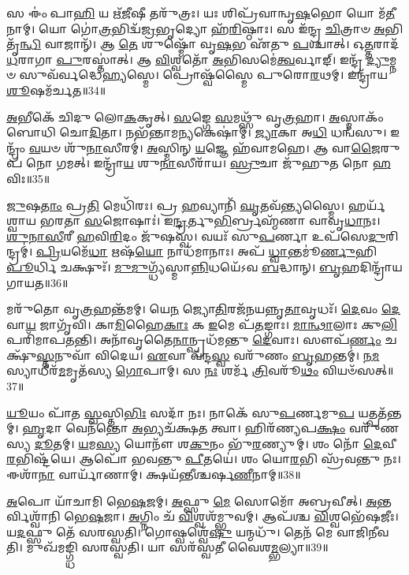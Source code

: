 𑌸 𑌈𑌂॑ 𑌪𑌾\-\ul{𑌹𑌿} 𑌯 𑌋᳴\-\ul{𑌜𑍀}\-𑌷𑍀 𑌤𑌰𑍁᳴𑌤𑍍𑌰𑌃।
𑌯𑌃 𑌶𑌿𑌪𑍍𑌰᳴𑌵𑌾𑌨𑍍𑌵𑍃\-\ul{𑌷}\-𑌭𑍋 𑌯𑍋 𑌮᳴\-\ul{𑌤𑍀}\-𑌨𑌾𑌮𑍍।
𑌯𑍋 𑌗𑍋॑\-\ul{𑌤𑍍𑌰}\-𑌭𑌿𑌦𑍍𑌵᳴\-\ul{𑌜𑍍𑌰}\-𑌭𑍃𑌦𑍍𑌯𑍋 𑌹᳴\-\ul{𑌰𑌿}\-𑌷𑍍𑌠𑌾𑌃।
𑌸 𑌇᳴𑌨𑍍𑌦𑍍𑌰 \ul{𑌚𑌿}\-𑌤𑍍𑌰𑌾𑍞 \ul{𑌅}\-𑌭𑌿 𑌤𑍃᳴\-\ul{𑌨𑍍𑌧𑌿} 𑌵𑌾𑌜𑌾𑌨𑍍᳴।
𑌆 \ul{𑌤𑍇} 𑌶𑍁𑌷𑍍𑌮𑍋᳴ 𑌵𑍃\-\ul{𑌷}\-𑌭 𑌏᳴𑌤𑍁 \ul{𑌪}\-𑌶𑍍𑌚𑌾𑌤𑍍।
𑌓\-\ul{𑌤𑍍𑌤}\-𑌰𑌾𑌦᳴\-\ul{𑌧}\-𑌰𑌾𑌗𑌾 \ul{𑌪𑍁}\-𑌰𑌸𑍍𑌤𑌾॑𑌤𑍍।
𑌆 \ul{𑌵𑌿}\-𑌶𑍍𑌵𑌤𑍋᳴ \ul{𑌅}\-𑌭𑌿𑌸𑌮𑍇॑\-\ul{𑌤𑍍𑌵}\-𑌰𑍍𑌵𑌾𑌙𑍍।
𑌇𑌨𑍍𑌦𑍍𑌰᳴ \ul{𑌦𑍍𑌯𑍁}\-𑌮𑍍𑌨𑍞 𑌸𑍁𑌵᳴𑌰𑍍𑌵𑌦𑍍𑌧𑍇\-\ul{𑌹𑍍𑌯}\-𑌸𑍍𑌮𑍇।
𑌪𑍍𑌰𑍋𑌷𑍍𑌵᳴𑌸𑍍𑌮𑍈 𑌪𑍁𑌰𑍋\-\ul{𑌰}\-𑌥𑌮𑍍।
𑌇𑌨𑍍𑌦𑍍𑌰𑌾᳴𑌯 \ul{𑌶𑍂}\-𑌷𑌮᳴𑌰𑍍𑌚𑌤॥34॥

\-\ul{𑌅}\-𑌭𑍀𑌕𑍇᳴ 𑌚𑌿𑌦𑍁 𑌲𑍋\-\ul{𑌕}\-𑌕𑍃𑌤𑍍।
\-\ul{𑌸}\-𑌙𑍍𑌗𑍇 \ul{𑌸}\-𑌮𑌥𑍍𑌸𑍁᳴ 𑌵𑍃\-\ul{𑌤𑍍𑌰}\-𑌹𑌾।
\-\ul{𑌅}\-𑌸𑍍𑌮𑌾𑌕𑌂᳴ 𑌬𑍋𑌧𑌿 𑌚𑍋\-\ul{𑌦𑌿}\-𑌤𑌾।
𑌨𑌭᳴𑌨𑍍𑌤𑌾𑌮\-\ul{𑌨𑍍𑌯}\-𑌕𑍇𑌷𑌾॑𑌮𑍍।
\-\ul{𑌜𑍍𑌯𑌾}\-𑌕𑌾 𑌅\-\ul{𑌧𑌿} 𑌧𑌨𑍍𑌵᳴𑌸𑍁।
𑌇𑌨𑍍𑌦𑍍𑌰𑌂᳴ \ul{𑌵}\-𑌯𑍞 𑌶𑍁᳴\-\ul{𑌨𑌾}\-𑌸𑍀𑌰𑌮𑍍॑।
\-\ul{𑌅}\-𑌸𑍍𑌮𑌿𑌨𑍍 \ul{𑌯}\-𑌜𑍍𑌞𑍇 𑌹᳴𑌵𑌾𑌮𑌹𑍇।
𑌆 𑌵𑌾\-\ul{𑌜𑍈}\-𑌰𑍁𑌪᳴ 𑌨𑍋 𑌗𑌮𑌤𑍍।
𑌇𑌨𑍍𑌦𑍍𑌰𑌾᳴\-\ul{𑌯} 𑌶𑍁\-\ul{𑌨𑌾}\-𑌸𑍀𑌰𑌾᳴𑌯।
\-\ul{𑌸𑍍𑌰𑍁}\-𑌚𑌾 𑌜𑍁᳴𑌹𑍁𑌤 𑌨𑍋 \ul{𑌹}\-𑌵𑌿𑌃॥35॥

\-\ul{𑌜𑍁}\-𑌷\-\ul{𑌤𑌾𑌂} 𑌪𑍍𑌰\-\ul{𑌤𑌿} 𑌮𑍇𑌧𑌿᳴𑌰𑌃।
𑌪𑍍𑌰 \ul{𑌹}\-𑌵𑍍𑌯𑌾𑌨𑌿᳴ \ul{𑌘𑍃}\-𑌤𑌵᳴𑌨𑍍𑌤𑍍𑌯𑌸𑍍𑌮𑍈।
𑌹𑌰𑍍𑌯᳴𑌶𑍍𑌵𑌾𑌯 𑌭𑌰𑌤𑌾 \ul{𑌸}\-𑌜𑍋𑌷𑌾𑌃॑।
𑌇\-\ul{𑌨𑍍𑌦𑍍𑌰}\-𑌰𑍍𑌤𑍁\-\ul{𑌭𑌿}\-𑌰𑍍𑌬𑍍𑌰𑌹𑍍𑌮᳴𑌣𑌾 𑌵𑌾𑌵𑍃\-\ul{𑌧𑌾}\-𑌨𑌃।
\-\ul{𑌶𑍁}\-\-\ul{𑌨𑌾}\-\-\ul{𑌸𑍀}\-𑌰𑍀 \ul{𑌹}\-𑌵𑌿\-\ul{𑌰𑌿}\-𑌦𑌂 𑌜𑍁᳴𑌷𑌸𑍍𑌵।
𑌵𑌯𑌃᳴ 𑌸𑍁\-\ul{𑌪}\-𑌰𑍍𑌣𑌾 𑌉𑌪᳴𑌸𑍇\-\ul{𑌦𑍁}\-𑌰𑌿𑌨𑍍𑌦𑍍𑌰𑌮𑍍॑।
\-\ul{𑌪𑍍𑌰𑌿}\-𑌯𑌮𑍇᳴\-\ul{𑌧𑌾} 𑌋𑌷᳴\-\ul{𑌯𑍋} 𑌨𑌾𑌧᳴𑌮𑌾𑌨𑌾𑌃।
𑌅𑌪᳴ \ul{𑌧𑍍𑌵𑌾}\-𑌨𑍍𑌤𑌮𑍂॑\-\ul{𑌰𑍍𑌣𑍁}\-𑌹𑌿 \ul{𑌪𑍂}\-𑌰𑍍𑌧𑌿 𑌚𑌕𑍍𑌷𑍁𑌃᳴।
\-\ul{𑌮𑍁}\-\-\ul{𑌮𑍁}\-𑌗𑍍𑌧𑍍𑌯᳴𑌸𑍍𑌮𑌾\-\ul{𑌨𑍍𑌨𑌿}\-𑌧𑌯𑍇᳴𑌽𑌵 \ul{𑌬}\-𑌦𑍍𑌧𑌾𑌨𑍍।
\-\ul{𑌬𑍃}\-𑌹𑌦𑌿𑌨𑍍𑌦𑍍𑌰𑌾᳴𑌯 𑌗𑌾𑌯𑌤॥36॥

𑌮𑌰𑍁᳴𑌤𑍋 𑌵𑍃\-\ul{𑌤𑍍𑌰}\-𑌹𑌨𑍍𑌤᳴𑌮𑌮𑍍।
𑌯𑍇\-\ul{𑌨} 𑌜𑍍𑌯𑍋\-\ul{𑌤𑌿}\-𑌰𑌜᳴𑌨𑌯𑌨𑍍𑌨𑍃\-\ul{𑌤𑌾}\-𑌵𑍃𑌧𑌃᳴।
\-\ul{𑌦𑍇}\-𑌵𑌂 \ul{𑌦𑍇}\-𑌵𑌾\-\ul{𑌯} 𑌜𑌾𑌗𑍃᳴𑌵𑌿।
𑌕𑌾\-\ul{𑌮𑌿}\-𑌹𑍈\-\ul{𑌕𑌾𑌃} 𑌕 \ul{𑌇}\-𑌮𑍇 𑌪᳴\-\ul{𑌤}\-𑌙𑍍𑌗𑌾𑌃।
\-\ul{𑌮𑌾}\-\-\ul{𑌨𑍍𑌥𑌾}\-𑌲𑌾𑌃 𑌕𑍁\-\ul{𑌲𑌿}\-𑌪𑌰𑌿᳴𑌮𑌾𑌪𑌤𑌨𑍍𑌤𑌿।
𑌅𑌨𑌾᳴𑌵𑍃𑌤𑍈\-\ul{𑌨𑌾}\-𑌨𑍍𑌪𑍍𑌰𑌧᳴𑌮𑌨𑍍𑌤𑍁 \ul{𑌦𑍇}\-𑌵𑌾𑌃।
𑌸𑍗𑌪᳴\-\ul{𑌰𑍍𑌣𑌂} 𑌚𑌕𑍍𑌷𑍁᳴\-\ul{𑌸𑍍𑌤}\-𑌨𑍁𑌵𑌾᳴ 𑌵𑌿𑌦𑍇𑌯।
\-\ul{𑌏}\-𑌵𑌾 𑌵᳴𑌨𑍍𑌦\-\ul{𑌸𑍍𑌵} 𑌵𑌰𑍁᳴𑌣𑌂 \ul{𑌬𑍃}\-𑌹𑌨𑍍𑌤𑌮𑍍॑।
\-\ul{𑌨}\-\-\ul{𑌮}\-𑌸𑍍𑌯𑌾𑌧𑍀𑌰᳴\-\ul{𑌮}\-𑌮𑍃𑌤᳴𑌸𑍍𑌯 \ul{𑌗𑍋}\-𑌪𑌾𑌮𑍍।
𑌸 \ul{𑌨𑌃} 𑌶𑌰𑍍𑌮᳴ \ul{𑌤𑍍𑌰𑌿}\-𑌵𑌰𑍂᳴\-\ul{𑌥𑌂} 𑌵𑌿𑌯𑍞᳴𑌸𑌤𑍍॥37॥

\-\ul{𑌯𑍂}\-𑌯𑌂 𑌪𑌾᳴𑌤 \ul{𑌸𑍍𑌵}\-𑌸𑍍𑌤𑌿\-\ul{𑌭𑌿𑌃} 𑌸𑌦𑌾᳴ 𑌨𑌃।
𑌨𑌾𑌕𑍇᳴ 𑌸𑍁\-\ul{𑌪}\-𑌰𑍍𑌣𑌮𑍁\-\ul{𑌪} 𑌯𑌤𑍍𑌪𑌤᳴𑌨𑍍𑌤𑌮𑍍।
\-\ul{𑌹𑍃}\-𑌦𑌾 𑌵𑍇𑌨᳴𑌨𑍍𑌤𑍋 \ul{𑌅}\-𑌭𑍍𑌯𑌚᳴𑌕𑍍𑌷𑌤 𑌤𑍍𑌵𑌾।
𑌹𑌿𑌰᳴𑌣𑍍𑌯𑌪\-\ul{𑌕𑍍𑌷𑌂} 𑌵𑌰𑍁᳴𑌣𑌸𑍍𑌯 \ul{𑌦𑍂}\-𑌤𑌮𑍍।
\-\ul{𑌯}\-𑌮\-\ul{𑌸𑍍𑌯} 𑌯𑍋𑌨𑍗᳴ 𑌶\-\ul{𑌕𑍁}\-𑌨𑌂 𑌭𑍁᳴\-\ul{𑌰}\-𑌣𑍍𑌯𑍁𑌮𑍍।
𑌶𑌂 𑌨𑍋᳴ \ul{𑌦𑍇}\-𑌵𑍀\-\ul{𑌰}\-𑌭𑌿𑌷𑍍𑌟᳴𑌯𑍇।
𑌆𑌪𑍋᳴ 𑌭𑌵𑌨𑍍𑌤𑍁 \ul{𑌪𑍀}\-𑌤𑌯𑍇॑।
𑌶𑌂 𑌯𑍋\-\ul{𑌰}\-𑌭𑌿 𑌸𑍍𑌰᳴𑌵𑌨𑍍𑌤𑍁 𑌨𑌃।
𑌈𑌶𑌾᳴\-\ul{𑌨𑌾} 𑌵𑌾𑌰𑍍𑌯𑌾᳴𑌣𑌾𑌮𑍍।
𑌕𑍍𑌷𑌯᳴𑌨𑍍𑌤𑍀𑌶𑍍𑌚𑌰𑍍\mbox{}𑌷\-\ul{𑌣𑍀}\-𑌨𑌾𑌮𑍍॥38॥

\-\ul{𑌅}\-𑌪𑍋 𑌯𑌾᳴𑌚𑌾𑌮𑌿 𑌭𑍇\-\ul{𑌷}\-𑌜𑌮𑍍।
\-\ul{𑌅}\-𑌫𑍍𑌸𑍁 \ul{𑌮𑍇} 𑌸𑍋𑌮𑍋᳴ 𑌅𑌬𑍍𑌰𑌵𑍀𑌤𑍍।
\-\ul{𑌅}\-𑌨𑍍𑌤𑌰𑍍𑌵𑌿𑌶𑍍𑌵𑌾᳴𑌨𑌿 𑌭𑍇\-\ul{𑌷}\-𑌜𑌾।
\-\ul{𑌅}\-𑌗𑍍𑌨𑌿𑌂 𑌚᳴ \ul{𑌵𑌿}\-𑌶𑍍𑌵𑌶᳴𑌮𑍍𑌭𑍁𑌵𑌮𑍍।
𑌆𑌪᳴𑌶𑍍𑌚 \ul{𑌵𑌿}\-𑌶𑍍𑌵𑌭𑍇᳴𑌷𑌜𑍀𑌃।
𑌯\-\ul{𑌦}\-𑌫𑍍𑌸𑍁 𑌤𑍇᳴ 𑌸𑌰𑌸𑍍𑌵𑌤𑌿।
𑌗𑍋𑌷𑍍𑌵𑌶𑍍𑌵𑍇᳴\-\ul{𑌷𑍁} 𑌯𑌨𑍍𑌮𑌧𑍁᳴।
𑌤𑍇𑌨᳴ 𑌮𑍇 𑌵𑌾𑌜𑌿𑌨𑍀𑌵𑌤𑌿।
𑌮𑍁𑌖᳴𑌮𑌙𑍍𑌗𑍍𑌧𑌿 𑌸𑌰𑌸𑍍𑌵𑌤𑌿।
𑌯𑌾 𑌸𑌰᳴𑌸𑍍𑌵𑌤𑍀 𑌵𑍈𑌶\-\ul{𑌮𑍍𑌭}\-𑌲𑍍𑌯𑌾॥39॥

